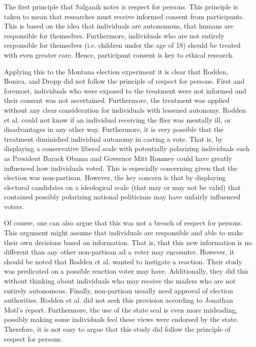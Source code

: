 \documentclass[12pt]{article}
\begin{document}
The first principle that Salganik notes is respect for persons. This principle is taken to mean that researches must receive informed consent from participants. This is based on the idea that individuals are autonomous, that humans are responsible for themselves. Furthermore, individuals who are not entirely responsible for themselves (i.e. children under the age of 18) should be treated with even greater care. Hence, participant consent is key to ethical research.

Applying this to the Montana election experiment it is clear that Rodden, Bonica, and Dropp did not follow the principle of respect for persons. First and foremost, individuals who were exposed to the treatment were not informed and their consent was not ascertained. Furthermore, the treatment was applied without any clear consideration for individuals with lessened autonomy. Rodden et al. could not know if an individual receiving the flier was mentally ill, or disadvantages in any other way. Furthermore, it is very possible that the treatment diminished individual autonomy in casting a vote. That is, by displaying a conservative liberal scale with potentially polarizing individuals such as President Barack Obama and Governor Mitt Romney could have greatly influenced how individuals voted. This is especially concerning given that the election was non-partisan.  However, the key concern is that by displaying electoral candidates on a ideological scale (that may or may not be valid) that contained possibly polarizing national politicians may have unfairly influenced voters.

Of course, one can also argue that this was not a breach of respect for persons. This argument might assume that individuals are responsible and able to make their own decisions based on information. That is, that this new information is no different than any other non-partisan ad a voter may encounter. However, it should be noted that Rodden et al. wanted to instigate a reaction. Their study was predicated on a possible reaction voter may have. Additionally, they did this without thinking about individuals who may receive the mailers who are not entirely autonomous. Finally, non-partisan usually need approval of election authorities. Rodden et al. did not seek this provision according to Jonathan Motl’s report. Furthermore, the use of the state seal is even more misleading, possibly making some individuals feel these views were endorsed by the state. Therefore, it is not easy to argue that this study did follow the principle of respect for persons.
\end{document}
